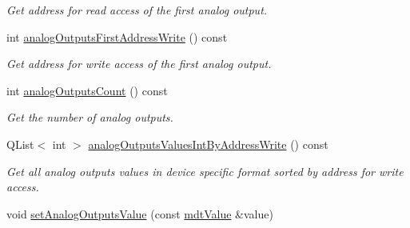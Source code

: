 \begin{DoxyCompactItemize}
\begin{DoxyCompactList}\small\item\em Get address for read access of the first analog output. \end{DoxyCompactList}\item 
\hypertarget{classmdt_device_ios_a5be4b1e87f1392a9d69127371c049ea9}{
int \hyperlink{classmdt_device_ios_a5be4b1e87f1392a9d69127371c049ea9}{analogOutputsFirstAddressWrite} () const }
\label{classmdt_device_ios_a5be4b1e87f1392a9d69127371c049ea9}

\begin{DoxyCompactList}\small\item\em Get address for write access of the first analog output. \end{DoxyCompactList}\item 
\hypertarget{classmdt_device_ios_a8b9b14c4968e5aaae60ac7f91f77e06c}{
int \hyperlink{classmdt_device_ios_a8b9b14c4968e5aaae60ac7f91f77e06c}{analogOutputsCount} () const }
\label{classmdt_device_ios_a8b9b14c4968e5aaae60ac7f91f77e06c}

\begin{DoxyCompactList}\small\item\em Get the number of analog outputs. \end{DoxyCompactList}\item 
\hypertarget{classmdt_device_ios_afc343f9733f297ee6359455f15308341}{
QList$<$ int $>$ \hyperlink{classmdt_device_ios_afc343f9733f297ee6359455f15308341}{analogOutputsValuesIntByAddressWrite} () const }
\label{classmdt_device_ios_afc343f9733f297ee6359455f15308341}

\begin{DoxyCompactList}\small\item\em Get all analog outputs values in device specific format sorted by address for write access. \end{DoxyCompactList}\item 
\hypertarget{classmdt_device_ios_a5d3edb5c95163dbe88ab5f17b6175f2b}{
void \hyperlink{classmdt_device_ios_a5d3edb5c95163dbe88ab5f17b6175f2b}{setAnalogOutputsValue} (const \hyperlink{classmdt_value}{mdtValue} \&value)}
\label{classmdt_device_ios_a5d3edb5c95163dbe88ab5f17b6175f2b}


\end{DoxyCompactItemize}
